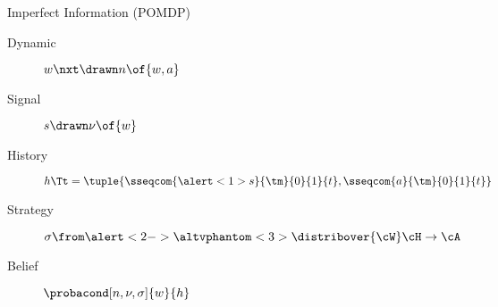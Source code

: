 \begin{frame}{Imperfect Information (POMDP)}
  \begin{description}
    \item[Dynamic]  \(w\nxt \drawn n \of{w, a}\)
    \item[Signal]   \(s \drawn \nu \of{w}\)
    \item[History]  \(h\Tt = \tuple{\sseqcom{\alert<1>{s}}{\tm}{0}{1}{t}, \sseqcom{a}{\tm}{0}{1}{t}}\)
    \item[Strategy] \(\sigma \from \alert<2->{\altvphantom<3>{\distribover{\cW}}{\cH}} \to \cA\)
    \item[Belief]   \(\probacond[n, \nu, \sigma]{w}{h}\)
  \end{description}
\end{frame}
